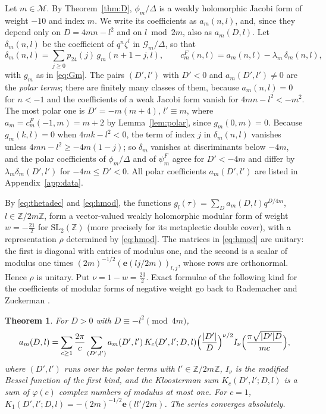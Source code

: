 \documentclass[11pt]{amsart}
\newtheorem{theorem}{Theorem}[section]
\theoremstyle{definition}
\newcommand{\ZZ}{\mathbb{Z}}
\newcommand{\pf}{p_{24}}
\newcommand{\cF}{c^{F}}
\newcommand{\Mset}{\mathcal{M}}
\newcommand{\e}{\mathbf{e}}
\begin{document}
Let $m\in\Mset$. By Theorem~\ref{thm:D}, $\phi_m/\Delta$ is a weakly holomorphic Jacobi form of weight $-10$ and index $m$. We write its coefficients as $a_m(n,l)$, and, since they depend only on $D=4mn-l^2$ and on $l\bmod 2m$, also as $a_m(D,l)$. Let $\delta_m(n,l)$ be the coefficient of $q^n\zeta^l$ in $\mathcal G_m/\Delta$, so that
\begin{equation}\label{eq:hdelta}
\delta_m(n,l)=\sum_{j\ge0}\pf(j)\,g_m(n+1-j,l),\qquad \cF_m(n,l)=a_m(n,l)-\lambda_m\,\delta_m(n,l),
\end{equation}
with $g_m$ as in \eqref{eq:Gm}. The pairs $(D',l')$ with $D'<0$ and $a_m(D',l')\ne0$ are the \emph{polar terms}; there are finitely many classes of them, because $a_m(n,l)=0$ for $n<-1$ and the coefficients of a weak Jacobi form vanish for $4mn-l^2<-m^2$. The most polar one is $D'=-m(m+4)$, $l'\equiv m$, where $a_m=\cF_m(-1,m)=m+2$ by Lemma~\ref{lem:polar}, since $g_m(0,m)=0$. Because $g_m(k,l)=0$ when $4mk-l^2<0$, the term of index $j$ in $\delta_m(n,l)$ vanishes unless $4mn-l^2\ge-4m(1-j)$; so $\delta_m$ vanishes at discriminants below $-4m$, and the polar coefficients of $\phi_m/\Delta$ and of $\psi^F_m$ agree for $D'<-4m$ and differ by $\lambda_m\delta_m(D',l')$ for $-4m\le D'<0$. All polar coefficients $a_m(D',l')$ are listed in Appendix~\ref{app:data}.

By \eqref{eq:thetadec} and \eqref{eq:hmod}, the functions $g_l(\tau)=\sum_Da_m(D,l)q^{D/4m}$, $l\in\ZZ/2m\ZZ$, form a vector-valued weakly holomorphic modular form of weight $w=-\frac{21}2$ for $\mathrm{SL}_2(\ZZ)$ (more precisely for its metaplectic double cover), with a representation $\rho$ determined by \eqref{eq:hmod}. The matrices in \eqref{eq:hmod} are unitary: the first is diagonal with entries of modulus one, and the second is a scalar of modulus one times $(2m)^{-1/2}(\e(lj/2m))_{l,j}$, whose rows are orthonormal. Hence $\rho$ is unitary. Put $\nu=1-w=\frac{23}2$. Exact formulae of the following kind for the coefficients of modular forms of negative weight go back to Rademacher and Zuckerman \cite{RZ38}.

\begin{theorem}\label{thm:rademacher}
For $D>0$ with $D\equiv-l^2\pmod{4m}$,
\begin{equation}\label{eq:rademacher}
a_m(D,l)=\sum_{c\ge1}\frac{2\pi}{c}\sum_{(D',l')}a_m(D',l')\,K_c(D',l';D,l)\Bigl(\frac{|D'|}{D}\Bigr)^{\nu/2}I_\nu\Bigl(\frac{\pi\sqrt{|D'|D}}{mc}\Bigr),
\end{equation}
where $(D',l')$ runs over the polar terms with $l'\in\ZZ/2m\ZZ$, $I_\nu$ is the modified Bessel function of the first kind, and the Kloosterman sum $K_c(D',l';D,l)$ is a sum of $\varphi(c)$ complex numbers of modulus at most one. For $c=1$, $K_1(D',l';D,l)=-(2m)^{-1/2}\e(ll'/2m)$. The series converges absolutely.
\end{theorem}
\end{document}
